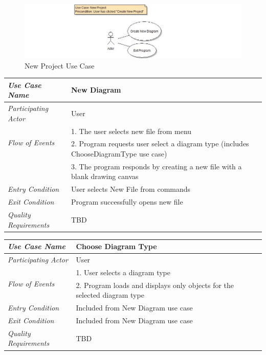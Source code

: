 \documentclass[twoside,letterpaper]{article}
\begin{document}
\begin{figure}[h]
\centering
\includegraphics[width=6.0in]{ucaseNewProj.jpg}
\caption{New Project Use Case}
\end{figure}

\begin{flushleft}
\tablehead{}
\begin{tabular}{|m{2.0in} m{5.0in}|}
\hline
{\bfseries\emph{Use Case Name}}
& {\bfseries New Diagram }
\\\hline
\emph{Participating Actor}
& User
\\\hline
\multirow{2}{*}{\emph{Flow of Events}}
& 1.  The user selects new file from menu \\
& 2.  Program requests user select a diagram type
(includes ChooseDiagramType use case) \\
& 3.  The program responds by creating a new file with a blank drawing canvas
\\\hline
\emph{Entry Condition}
& User selects New File from commands
\\\hline
\emph{Exit Condition}
& Program successfully opens new file
\\\hline
\emph{Quality Requirements}
& TBD
\\\hline
\end{tabular}
\end{flushleft}
\bigskip

\begin{flushleft}
\tablehead{}
\begin{tabular}{|m{2.0in} m{5.0in}|}
\hline
{\bfseries\emph{Use Case Name}}
& {\bfseries Choose Diagram Type}
\\\hline
\emph{Participating Actor}
& User 
\\\hline
\multirow{2}{*}{\emph{Flow of Events}}
& 1.  User selects a diagram type \\
& 2.  Program loads and displays only objects for the selected diagram type
\\\hline
\emph{Entry Condition}
& Included from New Diagram use case
\\\hline
\emph{Exit Condition}
& Included from New Diagram use case
\\\hline
\emph{Quality Requirements}
& TBD
\\\hline
\end{tabular}
\end{flushleft}
\bigskip
\end{document}
